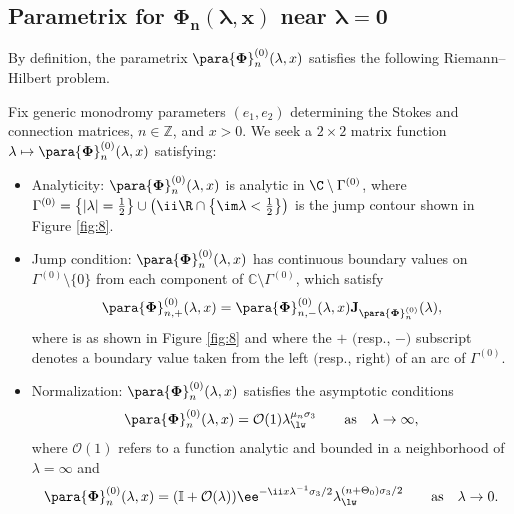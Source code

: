 \subsection[Parametrix for Phi\_n(lambda,x) near lambda=0]{Parametrix for $\boldsymbol{{\Phi}_n(\lambda,x)}$ near $\boldsymbol{\lambda=0}$}
By definition, the parametrix $\para{\boldsymbol \Phi}_n^{(0)}(\lambda,x)$ satisfies the following Riemann--Hilbert problem.
\begin{rhp} \label{rhp:zero_parametrix}
Fix generic monodromy parameters $( e_1, e_2 )$ determining the Stokes and connection matrices, $n\in\mathbb{Z}$, and $x>0$. We seek a $2 \times 2$ matrix function $\lambda\mapsto\para{\boldsymbol \Phi}_n^{(0)}(\lambda,x)$ satisfying:
\begin{itemize}\itemsep=0pt
\item Analyticity: $\para{\boldsymbol \Phi}_n^{(0)}(\lambda,x)$ is analytic in $\C \setminus \Gamma^{(0)}$, where $\Gamma^{(0)} = \big\{ | \lambda| = \frac{1}{2}\big\} \cup \big(\ii \R\cap \big\{ \im \lambda < \frac{1}{2}\big\}\big)$ is the jump contour shown in Figure {\rm\ref{fig:8}}.
\item  Jump condition: $\para{\boldsymbol \Phi}_n^{(0)}(\lambda,x)$ has continuous boundary values on $\Gamma^{(0)} \setminus \{0\}$ from each component of $\mathbb{C}\setminus \Gamma^{(0)}$, which satisfy
\[
\para{\boldsymbol \Phi}_{n,+}^{(0)}(\lambda,x) = \para{\boldsymbol \Phi}_{n,-}^{(0)}(\lambda,x)\mathbf J_{\para{\boldsymbol \Phi}_n^{(0)}}(\lambda),
\]
 where  is as shown in Figure {\rm\ref{fig:8}} and where the $+$ $($resp., $-)$ subscript denotes a boundary value taken from the left $($resp., right$)$ of an arc of $\Gamma^{(0)}$.
\item  Normalization: $\para{\boldsymbol \Phi}_n^{(0)}(\lambda,x)$ satisfies the asymptotic conditions
\begin{gather}
\label{eq:Phi_z-asymptotic-infinity}
\para{\boldsymbol \Phi}_n^{(0)}(\lambda,x) = \mathcal{O}(1) \lambda_{\lw}^{ {\mu_n \sigma_3}{}} \qquad \text{as} \quad \lambda \to \infty,
\end{gather}
where $\mathcal{O}(1)$ refers to a function analytic and bounded in a neighborhood of $\lambda=\infty$ and
\begin{equation}
\label{eq:Phi_z-asymptotic-zero}
\para{\boldsymbol \Phi}_n^{(0)}(\lambda,x) = ( \mathbb I + \mathcal{O}(\lambda) )\ee^{-\ii x\lambda^{-1}\sigma_3/2} \lambda_{\lw}^{ (n+ \Theta_0 )\sigma_3/2 } \qquad \text{as} \quad \lambda \to 0.
\end{equation}
\end{itemize}
\end{rhp}

